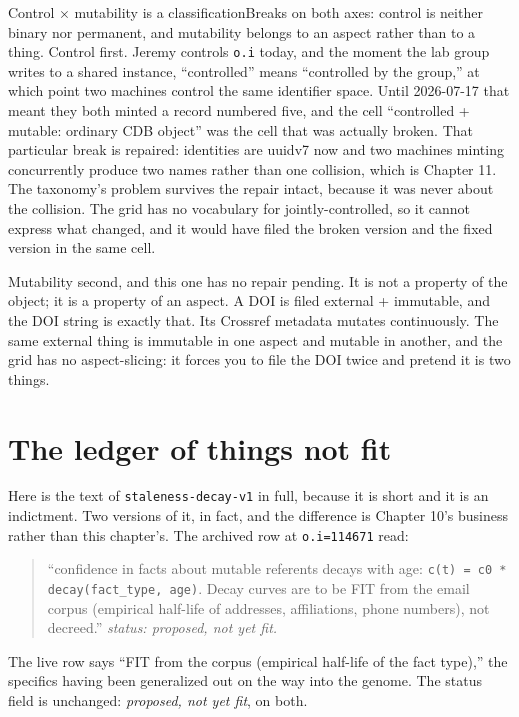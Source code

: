 \begin{Analogy}{Control $\times$ mutability is a classification}{Breaks on both axes: control is neither binary nor permanent, and mutability belongs to an aspect rather than to a thing.}
Control first. Jeremy controls \texttt{o.i} today, and the moment the lab group writes to a shared instance, ``controlled'' means ``controlled by the group,'' at which point two machines control the same identifier space. Until 2026-07-17 that meant they both minted a record numbered five, and the cell ``controlled + mutable: ordinary CDB object'' was the cell that was actually broken. That particular break is repaired: identities are uuidv7 now and two machines minting concurrently produce two names rather than one collision, which is Chapter 11. The taxonomy's problem survives the repair intact, because it was never about the collision. The grid has no vocabulary for jointly-controlled, so it cannot express what changed, and it would have filed the broken version and the fixed version in the same cell.

Mutability second, and this one has no repair pending. It is not a property of the object; it is a property of an aspect. A DOI is filed external + immutable, and the DOI string is exactly that. Its Crossref metadata mutates continuously. The same external thing is immutable in one aspect and mutable in another, and the grid has no aspect-slicing: it forces you to file the DOI twice and pretend it is two things.
\end{Analogy}

\section{The ledger of things not fit}

Here is the text of \texttt{staleness-decay-v1} in full, because it is short and it is an indictment. Two versions of it, in fact, and the difference is Chapter 10's business rather than this chapter's. The archived row at \texttt{o.i=114671} read:

\begin{quote}
\small ``confidence in facts about mutable referents decays with age: \texttt{c(t) = c0 * decay(fact\_type, age)}. Decay curves are to be FIT from the email corpus (empirical half-life of addresses, affiliations, phone numbers), not decreed.'' \emph{status: proposed, not yet fit.}
\end{quote}

The live row says ``FIT from the corpus (empirical half-life of the fact type),'' the specifics having been generalized out on the way into the genome. The status field is unchanged: \emph{proposed, not yet fit}, on both.

